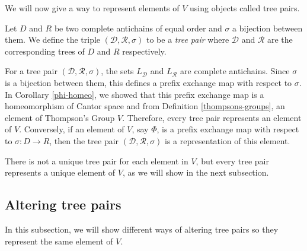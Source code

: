\documentclass[12pt]{amsart}
\newcommand{\D}{\mathcal{D}}
\newcommand{\R}{\mathcal{R}}
\begin{document}
        We will now give a way to represent elements of $V$ using objects called tree pairs. 
        
        \begin{definition}
            Let $D$ and $R$ be two complete antichains of equal order and $\sigma$ a bijection between them. We define the triple $(\D,\R,\sigma)$ to be a \textit{tree pair} where $\D$ and $\R$ are the corresponding trees of $D$ and $R$ respectively.
        \end{definition}
        
        For a tree pair $(\D,\R,\sigma)$, the sets $L_\D$ and $L_\R$ are complete antichains. Since $\sigma$ is a bijection between them, this defines a prefix exchange map with respect to $\sigma$. In Corollary \ref{phi-homeo}, we showed that this prefix exchange map is a homeomorphism of Cantor space and from Definition \ref{thompsons-groups}, an element of Thompson's Group $V$. Therefore, every tree pair represents an element of $V$. Conversely, if an element of $V$, say $\Phi$, is a prefix exchange map with respect to $\sigma : D \to R$, then the tree pair $(\D,\R,\sigma)$ is a representation of this element.
        
        \begin{remark}\label{not-unique-tree-pair}
            There is not a unique tree pair for each element in $V$, but every tree pair represents a unique element of $V$, as we will show in the next subsection.
        \end{remark}
        
        \subsection{Altering tree pairs}
            
            In this subsection, we will show different ways of altering tree pairs so they represent the same element of $V$.
        
\end{document}
